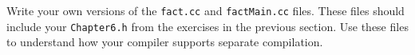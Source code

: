 %
%
\begin{question}
Write your own versions of the \verb|fact.cc| and \verb|factMain.cc|
files. These files should include your \verb|Chapter6.h| from the exercises in the
previous section. Use these files to understand how your compiler supports
separate compilation.
\end{question}
